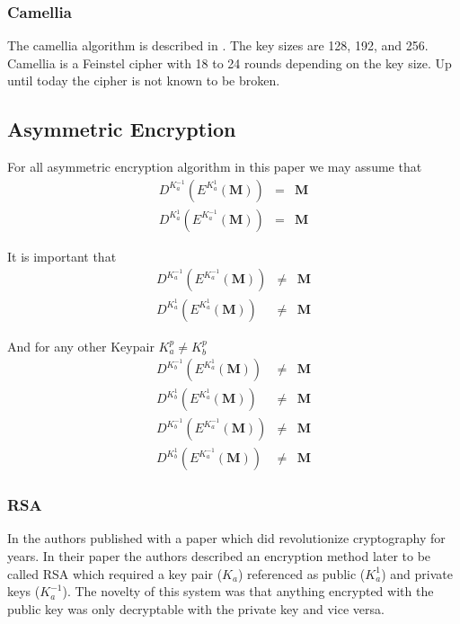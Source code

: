 \subsubsection{Camellia}
The camellia algorithm is described in \cite{RFC3713}. The key sizes are 128, 192, and 256. Camellia is a Feinstel cipher with 18 to 24 rounds depending on the key size. Up until today the cipher is not known to be broken. 

\subsection{Asymmetric Encryption}
For all asymmetric encryption algorithm in this paper we may assume that 
\begin{eqnarray}
	D^{K^{-1}_a}\left(E^{K^{1}_a}\left(\mathbf{M}\right)\right) & = & \mathbf{M}\\
	D^{K^{1}_a}\left(E^{K^{-1}_a}\left(\mathbf{M}\right)\right) & = & \mathbf{M}
\end{eqnarray} 

It is important that 
\begin{eqnarray}
	D^{K^{-1}_a}\left(E^{K^{-1}_a}\left(\mathbf{M}\right)\right) & \neq & \mathbf{M}\\
	D^{K^{1}_a}\left(E^{K^{1}_a}\left(\mathbf{M}\right)\right)   & \neq & \mathbf{M}
\end{eqnarray} 

And for any other Keypair $K^{p}_a \neq K^{p}_b$
\begin{eqnarray}
	D^{K^{-1}_b}\left(E^{K^{1}_a}\left(\mathbf{M}\right)\right)  & \neq & \mathbf{M}\\
	D^{K^{1}_b}\left(E^{K^{1}_a}\left(\mathbf{M}\right)\right)   & \neq & \mathbf{M}\\
	D^{K^{-1}_b}\left(E^{K^{-1}_a}\left(\mathbf{M}\right)\right) & \neq & \mathbf{M}\\
	D^{K^{1}_b}\left(E^{K^{-1}_a}\left(\mathbf{M}\right)\right)  & \neq & \mathbf{M}
\end{eqnarray} 


\subsubsection{RSA}
In \citeyear{Rivest:1978:MOD:359340.359342} the authors \citeauthor{Rivest:1978:MOD:359340.359342} published with \cite{Rivest:1978:MOD:359340.359342} a paper which did revolutionize cryptography for years. In their paper the authors described an encryption method later to be called RSA which required a key pair ($K_a$) referenced as public ($K^{1}_a$) and private keys ($K^{-1}_a$). The novelty of this system was that anything encrypted with the public key was only decryptable with the private key and vice versa.

